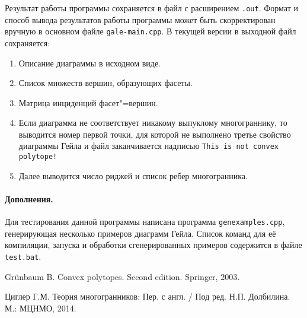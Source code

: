 \documentclass[12pt]{article}
\begin{document}
Результат работы программы сохраняется в файл с расширением \texttt{.out}. Формат и способ вывода результатов работы программы может быть скорректирован вручную в основном файле \texttt{gale-main.cpp}. В текущей версии в выходной файл сохраняется:
\begin{enumerate}
	\item Описание диаграммы в исходном виде.
	\item Список множеств вершин, образующих фасеты.
	\item Матрица инциденций фасет"=вершин.
	\item Если диаграмма не соответствует никакому выпуклому многограннику, то выводится номер первой точки, для которой не выполнено третье свойство диаграммы Гейла и файл заканчивается надписью	\texttt{This is not convex polytope!}
	\item Далее выводится число риджей и список ребер многогранника.
\end{enumerate}  

\paragraph{Дополнения.}
Для тестирования данной программы написана программа \texttt{genexamples.cpp}, генерирующая несколько примеров диаграмм Гейла. Список команд для её компиляции, запуска и обработки сгенерированных примеров содержится в файле \texttt{test.bat}.

\begin{thebibliography}{9}
    
Gr\"unbaum B.
Convex polytopes. Second edition.
Springer, 2003. 
 
Циглер Г.М. 
Теория многогранников: Пер. с англ. / Под ред. Н.П. Долбилина. М.: МЦНМО, 2014. 

\end{thebibliography}
\end{document}
